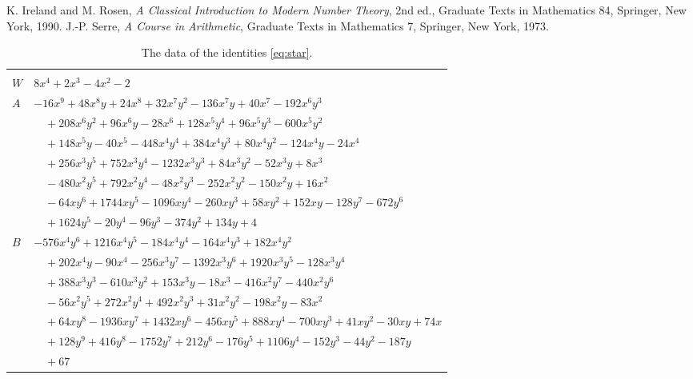 \documentclass[11pt]{article}
\begin{document}
\begin{thebibliography}{9}
 K. Ireland and M. Rosen, \emph{A Classical Introduction to Modern Number Theory}, 2nd ed., Graduate Texts in Mathematics 84, Springer, New York, 1990.
 J.-P. Serre, \emph{A Course in Arithmetic}, Graduate Texts in Mathematics 7, Springer, New York, 1973.
\end{thebibliography}

\clearpage
\begingroup\footnotesize
\setlength{\LTcapwidth}{\textwidth}
\begin{longtable}{@{}ll@{}}
\caption{The data of the identities \eqref{eq:star}.}\label{tab:star}\\
\hline\endfirsthead\hline\endhead\hline\endfoot
\multicolumn{2}{@{}l}{$i=0$, $m=1$, neighbours $3,6,7,8,20,26,27,31,35$}\\
$W$ & $8x^{4}+2x^{3}-4x^{2}-2$\\
$A$ & $-16x^{9}+48x^{8}y+24x^{8}+32x^{7}y^{2}-136x^{7}y+40x^{7}-192x^{6}y^{3}$\\
 & $\quad +208x^{6}y^{2}+96x^{6}y-28x^{6}+128x^{5}y^{4}+96x^{5}y^{3}-600x^{5}y^{2}$\\
 & $\quad +148x^{5}y-40x^{5}-448x^{4}y^{4}+384x^{4}y^{3}+80x^{4}y^{2}-124x^{4}y-24x^{4}$\\
 & $\quad +256x^{3}y^{5}+752x^{3}y^{4}-1232x^{3}y^{3}+84x^{3}y^{2}-52x^{3}y+8x^{3}$\\
 & $\quad -480x^{2}y^{5}+792x^{2}y^{4}-48x^{2}y^{3}-252x^{2}y^{2}-150x^{2}y+16x^{2}$\\
 & $\quad -64xy^{6}+1744xy^{5}-1096xy^{4}-260xy^{3}+58xy^{2}+152xy-128y^{7}-672y^{6}$\\
 & $\quad +1624y^{5}-20y^{4}-96y^{3}-374y^{2}+134y+4$\\
$B$ & $-576x^{4}y^{6}+1216x^{4}y^{5}-184x^{4}y^{4}-164x^{4}y^{3}+182x^{4}y^{2}$\\
 & $\quad +202x^{4}y-90x^{4}-256x^{3}y^{7}-1392x^{3}y^{6}+1920x^{3}y^{5}-128x^{3}y^{4}$\\
 & $\quad +388x^{3}y^{3}-610x^{3}y^{2}+153x^{3}y-18x^{3}-416x^{2}y^{7}-440x^{2}y^{6}$\\
 & $\quad -56x^{2}y^{5}+272x^{2}y^{4}+492x^{2}y^{3}+31x^{2}y^{2}-198x^{2}y-83x^{2}$\\
 & $\quad +64xy^{8}-1936xy^{7}+1432xy^{6}-456xy^{5}+888xy^{4}-700xy^{3}+41xy^{2}-30xy+74x$\\
 & $\quad +128y^{9}+416y^{8}-1752y^{7}+212y^{6}-176y^{5}+1106y^{4}-152y^{3}-44y^{2}-187y$\\
 & $\quad +67$\\

\end{longtable}
\end{document}

